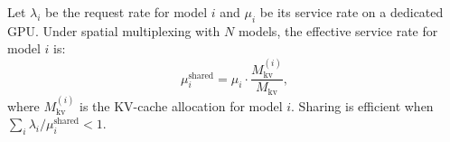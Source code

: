 \begin{theorem}
Let $\lambda_i$ be the request rate for model $i$ and $\mu_i$ be its service
rate on a dedicated GPU. Under spatial multiplexing with $N$ models, the
effective service rate for model $i$ is:
\begin{equation}
\mu_i^{\text{shared}} = \mu_i \cdot \frac{M_{\text{kv}}^{(i)}}{M_{\text{kv}}},
\end{equation}
where $M_{\text{kv}}^{(i)}$ is the KV-cache allocation for model $i$.
Sharing is efficient when $\sum_i \lambda_i / \mu_i^{\text{shared}} < 1$.
\end{theorem}

